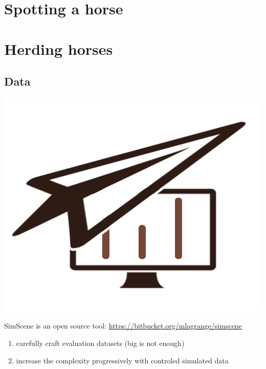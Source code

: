 \documentclass[a4paper,fleqn]{tufte-handout}
\begin{document}
\section{Spotting a horse}

\cite{aucouturier2007bag}

\cite{lagrange:hal-01082501}

\section{Herding horses}



\subsection{Data}

\begin{marginfigure}
\begin{center}
\includegraphics[width=\textwidth]{figures/logo} 
\end{center}
\caption{\label{fig:simScene} SimScene is an open source tool: \url{https://bitbucket.org/mlagrange/simscene}}
\end{marginfigure}

\begin{enumerate}
\item carefully craft evaluation datasets (big is not enough)
\item increase the complexity progressively with controled simulated data
\end{enumerate}
\end{document}
